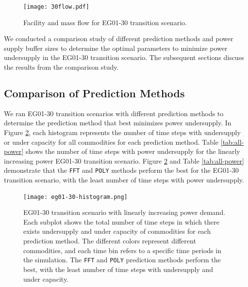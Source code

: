 \begin{figure}[]
    \centering
    \texttt{[image: 30flow.pdf]} 
    \caption{Facility and mass flow for EG01-30 transition scenario.}
    \label{fig:30flow}
\end{figure}

We conducted a comparison study of different prediction 
methods and power supply buffer sizes to determine the 
optimal \deploy parameters to minimize 
power undersupply in the EG01-30 \Cyclus 
transition scenario. 
The subsequent sections discuss the results from the comparison 
study. 

\subsection{Comparison of Prediction Methods}
We ran EG01-30 transition scenarios with different prediction 
methods to determine the prediction method that best minimizes 
power undersupply. 
In Figure \ref{fig:eg30under}, each histogram represents 
the number of time steps with undersupply or 
under capacity for all commodities for each prediction method.  
Table \ref{tab:all-power} shows the number of time steps with power 
undersupply for the linearly increasing power EG01-30 transition scenario. 
Figure \ref{fig:eg30under} and Table \ref{tab:all-power}
demonstrate that the \texttt{FFT} and \texttt{POLY} methods 
perform the best for the EG01-30 transition scenario, 
with the least number of time steps with power undersupply.

\begin{figure}[]
	\centering
	\texttt{[image: eg01-30-histogram.png]} 
	\caption{
	EG01-30 transition scenario with linearly increasing power demand. 
	Each subplot shows the total number of time steps in which there exists 
	undersupply and under capacity of commodities for each prediction method. 
	The different colors represent different commodities, and each time bin 
	refers to a specific time periods in the simulation.
    The \texttt{FFT} and \texttt{POLY} prediction methods perform the best, 
    with the least number of 
	time steps with undersupply and under capacity.}
	\label{fig:eg30under}
\end{figure}

